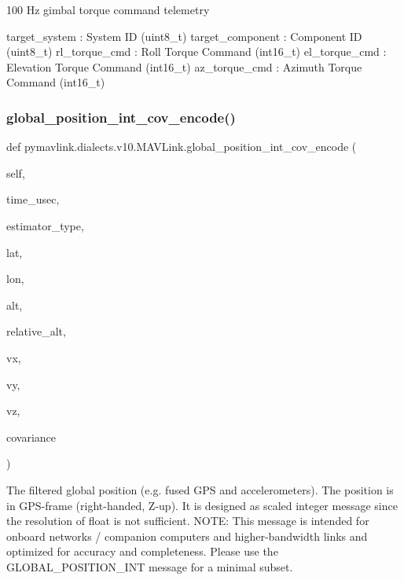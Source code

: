 \begin{DoxyVerb}
\begin{DoxyVerb}
\begin{DoxyVerb}100 Hz gimbal torque command telemetry

target_system             : System ID (uint8_t)
target_component          : Component ID (uint8_t)
rl_torque_cmd             : Roll Torque Command (int16_t)
el_torque_cmd             : Elevation Torque Command (int16_t)
az_torque_cmd             : Azimuth Torque Command (int16_t)\end{DoxyVerb}
 \mbox{\label{classpymavlink_1_1dialects_1_1v10_1_1MAVLink_a2dd5607cfdd5edd95c77b831834be2c7}} 
\subsubsection{\texorpdfstring{global\+\_\+position\+\_\+int\+\_\+cov\+\_\+encode()}{global\_position\_int\_cov\_encode()}}
{\footnotesize\ttfamily def pymavlink.\+dialects.\+v10.\+M\+A\+V\+Link.\+global\+\_\+position\+\_\+int\+\_\+cov\+\_\+encode (\begin{DoxyParamCaption}\item[{}]{self,  }\item[{}]{time\+\_\+usec,  }\item[{}]{estimator\+\_\+type,  }\item[{}]{lat,  }\item[{}]{lon,  }\item[{}]{alt,  }\item[{}]{relative\+\_\+alt,  }\item[{}]{vx,  }\item[{}]{vy,  }\item[{}]{vz,  }\item[{}]{covariance }\end{DoxyParamCaption})}

\begin{DoxyVerb}The filtered global position (e.g. fused GPS and accelerometers). The
position is in GPS-frame (right-handed, Z-up). It  is
designed as scaled integer message since the
resolution of float is not sufficient. NOTE: This
message is intended for onboard networks / companion
computers and higher-bandwidth links and optimized for
accuracy and completeness. Please use the
GLOBAL_POSITION_INT message for a minimal subset.


\end{DoxyVerb}
\end{DoxyVerb}
\end{DoxyVerb}
